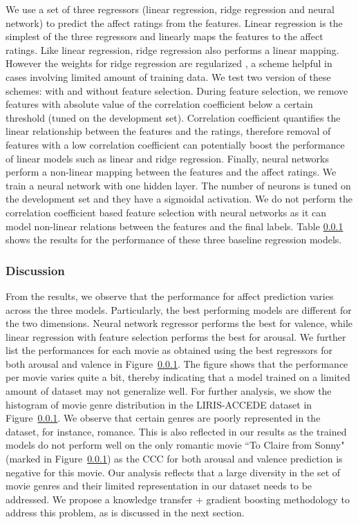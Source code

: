 \documentclass{article}
\begin{document}
We use a set of three regressors (linear regression, ridge regression and neural network) to predict the affect ratings from the features. 
Linear regression \cite{} is the simplest of the three regressors and linearly maps the features to the affect ratings.
Like linear regression, ridge regression \cite{} also performs a linear mapping.
However the weights for ridge regression are regularized \cite{}, a scheme helpful in cases involving limited amount of training data.
We test two version of these schemes: with and without feature selection.
During feature selection, we remove features with absolute value of the correlation coefficient below a certain threshold (tuned on the development set).
Correlation coefficient quantifies the linear relationship between the features and the ratings, therefore removal of features with a low correlation coefficient can potentially boost the performance of linear models such as linear and ridge regression. 
Finally, neural networks perform a non-linear mapping between the features and the affect ratings. 
We train a neural network with one hidden layer.
The number of neurons is tuned on the development set and they have a sigmoidal activation.
We do not perform the correlation coefficient based feature selection with neural networks as it can model non-linear relations between the features and the final labels. 
Table \ref{} shows the results for the performance of these three baseline regression models. 


\subsubsection{Discussion} From the results, we observe that the performance for affect prediction varies across the three models.
Particularly, the best performing models are different for the two dimensions.
Neural network regressor performs the best for valence, while linear regression with feature selection performs the best for arousal.
We further list the performances for each movie as obtained using the best regressors for both arousal and valence in Figure~\ref{}. 
The figure shows that the performance per movie varies quite a bit, thereby indicating that a model trained on a limited amount of dataset may not generalize well.
For further analysis, we show the histogram of movie genre distribution in the LIRIS-ACCEDE dataset in Figure~\ref{}.
We observe that certain genres are poorly represented in the dataset, for instance, romance.
This is also reflected in our results as the trained models do not perform well on the only romantic movie ``To Claire from Sonny" (marked in Figure~\ref{}) as the CCC for both arousal and valence prediction is negative for this movie. 
Our analysis reflects that a large diversity in the set of movie genres and their limited representation in our dataset needs to be addressed.
We propose a knowledge transfer + gradient boosting methodology to address this problem, as is discussed in the next section.
\end{document}
